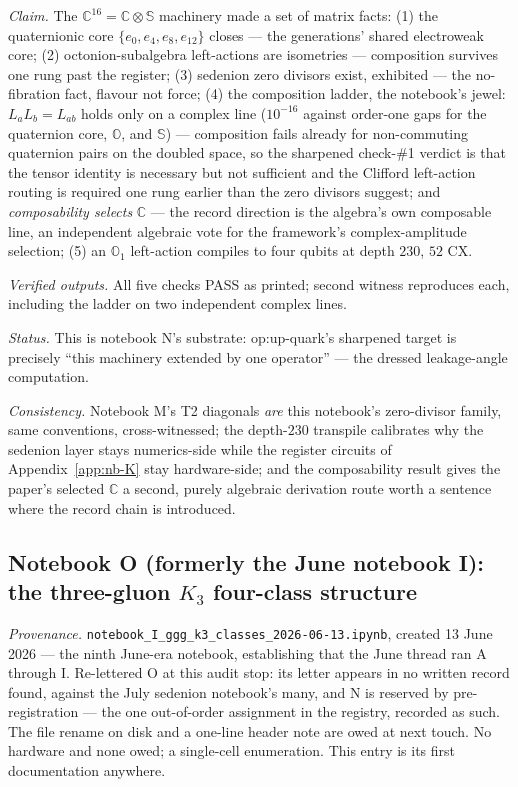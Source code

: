 \emph{Claim.} The $\mathbb{C}^{16} = \mathbb{C} \otimes \mathbb{S}$ machinery made a set of
matrix facts: (1) the quaternionic core $\{e_{0}, e_{4}, e_{8}, e_{12}\}$ closes --- the
generations' shared electroweak core; (2) octonion-subalgebra left-actions are isometries ---
composition survives one rung past the register; (3) sedenion zero divisors exist, exhibited
--- the no-fibration fact, flavour not force; (4) the composition ladder, the notebook's jewel:
$L_{a}L_{b} = L_{ab}$ holds only on a complex line ($10^{-16}$ against order-one gaps for the
quaternion core, $\mathbb{O}$, and $\mathbb{S}$) --- composition fails already for
non-commuting quaternion pairs on the doubled space, so the sharpened check-\#1 verdict is that
the tensor identity is necessary but not sufficient and the Clifford left-action routing is
required one rung earlier than the zero divisors suggest; and \emph{composability selects}
$\mathbb{C}$ --- the record direction is the algebra's own composable line, an independent
algebraic vote for the framework's complex-amplitude selection; (5) an $\mathbb{O}_{1}$
left-action compiles to four qubits at depth $230$, $52$ CX.

\emph{Verified outputs.} All five checks PASS as printed; second witness reproduces each,
including the ladder on two independent complex lines.

\emph{Status.} This is notebook N's substrate: op:up-quark's sharpened target is precisely
``this machinery extended by one operator'' --- the dressed leakage-angle computation.

\emph{Consistency.} Notebook M's T2 diagonals \emph{are} this notebook's zero-divisor family,
same conventions, cross-witnessed; the depth-$230$ transpile calibrates why the sedenion layer
stays numerics-side while the register circuits of Appendix~\ref{app:nb-K} stay hardware-side;
and the composability result gives the paper's selected $\mathbb{C}$ a second, purely algebraic
derivation route worth a sentence where the record chain is introduced.

\subsection{Notebook O (formerly the June notebook I): the three-gluon $K_{3}$ four-class
structure}
\label{app:nb-O}

\emph{Provenance.} \texttt{notebook\_I\_ggg\_k3\_classes\_2026-06-13.ipynb}, created 13 June
2026 --- the ninth June-era notebook, establishing that the June thread ran A through I.
Re-lettered O at this audit stop: its letter appears in no written record found, against the
July sedenion notebook's many, and N is reserved by pre-registration --- the one out-of-order
assignment in the registry, recorded as such. The file rename on disk and a one-line header
note are owed at next touch. No hardware and none owed; a single-cell enumeration. This entry
is its first documentation anywhere.

